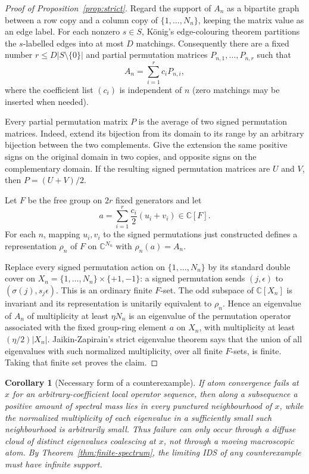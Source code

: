 \documentclass[11pt]{article}
\newtheorem{corollary}{Corollary}
\theoremstyle{definition}
\theoremstyle{remark}
\begin{document}
\begin{proof}[Proof of Proposition~\ref{prop:strict}]
Regard the support of $A_n$ as a bipartite graph between a row copy and a
column copy of $\{1,\ldots,N_n\}$, keeping the matrix value as an edge label.
For each nonzero $s\in S$, K\"onig's edge-colouring theorem partitions the
$s$-labelled edges into at most $D$ matchings.  Consequently there are a
fixed number $r\le D|S\setminus\{0\}|$ and partial permutation matrices
$P_{n,1},\ldots,P_{n,r}$ such that
\[
                       A_n=\sum_{i=1}^r c_iP_{n,i},
\tag{9}\label{eq:partials}
\]
where the coefficient list $(c_i)$ is independent of $n$ (zero matchings may
be inserted when needed).

Every partial permutation matrix $P$ is the average of two signed permutation
matrices.  Indeed, extend its bijection from its domain to its range by an
arbitrary bijection between the two complements.  Give the extension the
same positive signs on the original domain in two copies, and opposite signs
on the complementary domain.  If the resulting signed permutation matrices
are $U$ and $V$, then $P=(U+V)/2$.

Let $F$ be the free group on $2r$ fixed generators and let
\[
                         a=\sum_{i=1}^r\frac{c_i}{2}(u_i+v_i)
                         \in\mathbb C[F].
\]
For each $n$, mapping $u_i,v_i$ to the signed permutations just constructed
defines a representation $\rho_n$ of $F$ on $\mathbb C^{N_n}$ with
$\rho_n(a)=A_n$.

Replace every signed permutation action on $\{1,\ldots,N_n\}$ by its standard
double cover on
$X_n=\{1,\ldots,N_n\}\times\{+1,-1\}$: a signed permutation sends
$(j,\epsilon)$ to $(\sigma(j),s_j\epsilon)$.  This is an ordinary finite
$F$-set.  The odd subspace of $\mathbb C[X_n]$ is invariant and its
representation is unitarily equivalent to $\rho_n$.  Hence an eigenvalue of
$A_n$ of multiplicity at least $\eta N_n$ is an eigenvalue of the permutation
operator associated with the fixed group-ring element $a$ on $X_n$, with
multiplicity at least $(\eta/2)|X_n|$.  Jaikin-Zapirain's strict eigenvalue
theorem says that the union of all eigenvalues with such normalized
multiplicity, over all finite $F$-sets, is finite.  Taking that finite set
proves the claim.
\end{proof}

\begin{corollary}[Necessary form of a counterexample]
\label{cor:diffuse}
If atom convergence fails at $x$ for an arbitrary-coefficient local operator
sequence, then along a subsequence a positive amount of spectral mass lies in
every punctured neighbourhood of $x$, while the normalized multiplicity of
each eigenvalue in a sufficiently small such neighbourhood is arbitrarily
small.  Thus failure can only occur through a diffuse cloud of distinct
eigenvalues coalescing at $x$, not through a moving macroscopic atom.  By
Theorem~\ref{thm:finite-spectrum}, the limiting IDS of any counterexample must
have infinite support.
\end{corollary}
\end{document}
